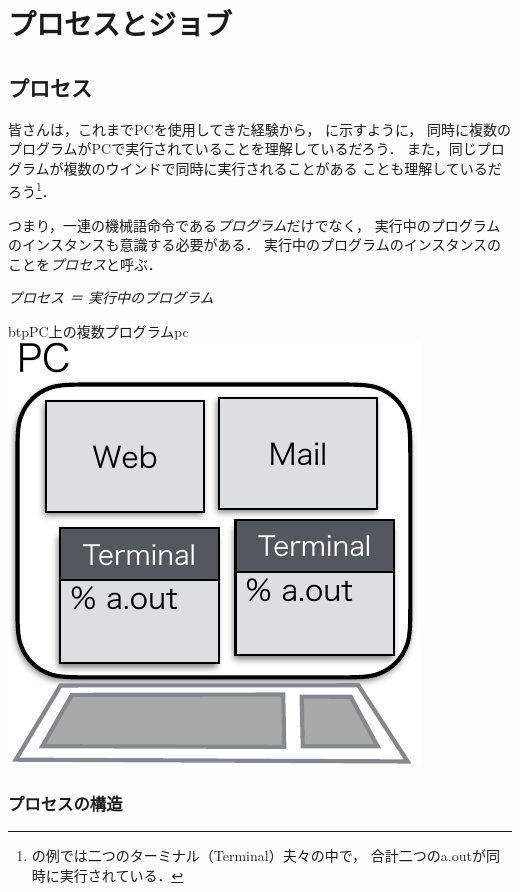 \chapter{プロセスとジョブ}

\section{プロセス}
皆さんは，これまでPCを使用してきた経験から，
に示すように，
同時に複数のプログラムがPCで実行されていることを理解しているだろう．
また，同じプログラムが複数のウインドで同時に実行されることがある
ことも理解しているだろう\footnote{
の例では二つのターミナル（Terminal）夫々の中で，
合計二つのa.outが同時に実行されている．
}．

つまり，一連の機械語命令である\emph{プログラム}だけでなく，
実行中のプログラムのインスタンスも意識する必要がある．
実行中のプログラムのインスタンスのことを\emph{プロセス}と呼ぶ．

\begin{center}
  \emph{\Large プロセス ＝ 実行中のプログラム}
\end{center}

\begin{myfig}{btp}{PC上の複数プログラム}{pc}
  \includegraphics[scale=0.7]{Fig/pc-crop.pdf}
\end{myfig}

\subsection{プロセスの構造}

